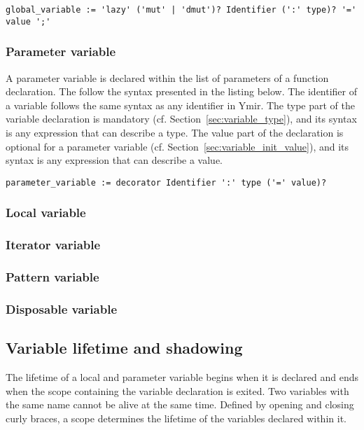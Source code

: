 \begin{lstlisting}[style=bashVerb]
global_variable := 'lazy' ('mut' | 'dmut')? Identifier (':' type)? '=' value ';'
\end{lstlisting}

\subsubsection*{Parameter variable}

A parameter variable is declared within the list of parameters of a function
declaration. The follow the syntax presented in the listing below. The
identifier of a variable follows the same syntax as any identifier in Ymir. The
type part of the variable declaration is mandatory (cf.
Section~\ref{sec:variable_type}), and its syntax is any expression that can
describe a type. The value part of the declaration is optional for a parameter
variable (cf. Section~\ref{sec:variable_init_value}), and its syntax is any
expression that can describe a value.

\begin{lstlisting}[style=bashVerb]
parameter_variable := decorator Identifier ':' type ('=' value)?
\end{lstlisting}

\subsubsection*{Local variable}
\subsubsection*{Iterator variable}
\subsubsection*{Pattern variable}
\subsubsection*{Disposable variable}

\subsection{Variable lifetime and shadowing}

The lifetime of a local and parameter variable begins when it is declared and
ends when the scope containing the variable declaration is exited. Two variables
with the same name cannot be alive at the same time. Defined by opening and
closing curly braces, a scope determines the lifetime of the variables declared
within it.

